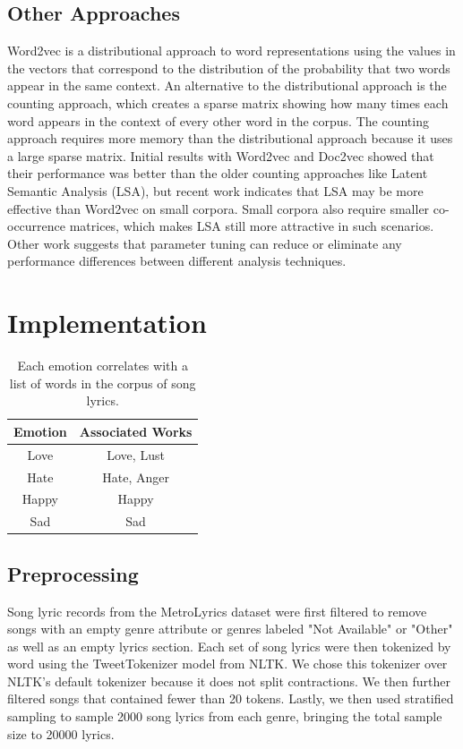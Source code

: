 \documentclass[10pt,twocolumn]{article}
\begin{document}
\subsection{Other Approaches}
Word2vec is a distributional approach to word representations using the values in the vectors that correspond to the distribution of the probability that two words appear in the same context.  An alternative to the distributional approach is the counting approach, which creates a sparse matrix showing how many times each word appears in the context of every other word in the corpus.  The counting approach requires more memory than the distributional approach because it uses a large sparse matrix.  Initial results with Word2vec and Doc2vec showed that their performance was better than the older counting approaches like Latent Semantic Analysis (LSA), but recent work indicates that LSA may be more effective than Word2vec on small corpora. \cite{a10}  Small corpora also require smaller co-occurrence matrices, which makes LSA still more attractive in such scenarios.  Other work suggests that parameter tuning can reduce or eliminate any performance differences between different analysis techniques. \cite{a11}
  
\section{Implementation}


\begin{table}[!hb]
\begin{center}
 \begin{tabular}{ | c | c | } 
 \hline
\textbf{Emotion} & \textbf{Associated Works} \\ [0.5ex] 
 \hline
Love & Love, Lust \\ 
 \hline
Hate & Hate, Anger \\ 
 \hline
Happy & Happy \\ 
 \hline
Sad & Sad \\ 
 \hline
\end{tabular}
\caption{Each emotion correlates with a list of words in the corpus of song lyrics.}
\end{center}
\end{table}

\subsection{Preprocessing}

Song lyric records from the MetroLyrics dataset were first filtered to remove songs with an empty genre attribute or genres labeled "Not Available" or "Other" as well as an empty lyrics section.  Each set of song lyrics were then tokenized by word using the TweetTokenizer model from NLTK.  We chose this tokenizer over NLTK's default tokenizer because it does not split contractions.  We then further filtered songs that contained fewer than 20 tokens.  Lastly, we then used stratified sampling to sample 2000 song lyrics from each genre, bringing the total sample size to 20000 lyrics.  
\end{document}
